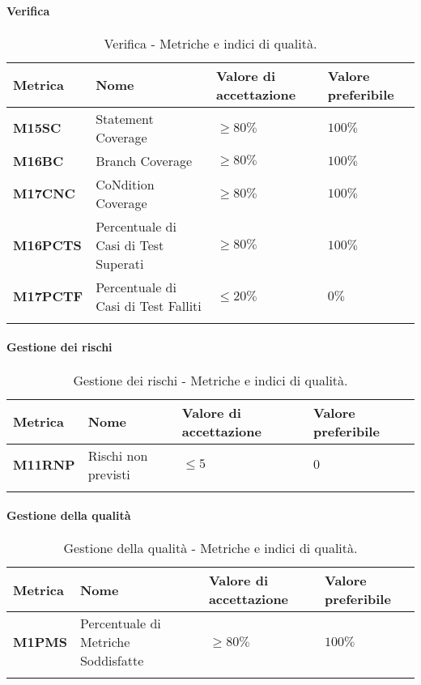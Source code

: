 \paragraph{Verifica}
\hspace{1pt}
\begin{longtable}{|C{1.5cm}|L{3cm}|L{2.5cm}|L{2.5cm}|}
    \hline
    \textbf{Metrica} & \textbf{Nome} & \textbf{Valore di accettazione} & \textbf{Valore preferibile} \\
    \hline
    \textbf{M15SC} & Statement Coverage & $\geq 80\%$ & $100\%$ \\
    \hline
    \textbf{M16BC} & Branch Coverage & $\geq 80\%$ & $100\%$ \\
    \hline
    \textbf{M17CNC} & CoNdition Coverage & $\geq 80\%$ & $100\%$ \\
    \hline
    \textbf{M16PCTS} & Percentuale di Casi di Test Superati & $\geq 80\%$ & $100\%$ \\
    \hline
    \textbf{M17PCTF} & Percentuale di Casi di Test Falliti & $\leq 20\%$ & $0\%$ \\
    \hline
\caption{Verifica - Metriche e indici di qualità.}
\label{tab:metriche_testo}
\end{longtable}


\paragraph{Gestione dei rischi}
\hspace{1pt}
    \begin{longtable}{|C{1.5cm}|L{3cm}|L{2.5cm}|L{2.5cm}|}
        \hline
      \textbf{Metrica} & \textbf{Nome} & \textbf{Valore di accettazione} & \textbf{Valore preferibile} \\
      \hline
      \textbf{M11RNP}    & Rischi non previsti  & $\leq 5$ &   $0$ \\
      \hline
    \caption{Gestione dei rischi - Metriche e indici di qualità.}
    \label{tab:tabella2}
\end{longtable}


\paragraph{Gestione della qualità}
\hspace{1pt}
    \begin{longtable}{|C{1.5cm}|L{3cm}|L{2.5cm}|L{2.5cm}|}
        \hline
        \textbf{Metrica} & \textbf{Nome} & \textbf{Valore di accettazione} & \textbf{Valore preferibile} \\
        \hline
        \textbf{M1PMS} & Percentuale di Metriche Soddisfatte & $\geq 80\%$ & $100\%$ \\
        \hline
    \caption{Gestione della qualità - Metriche e indici di qualità.}
    \label{tab:gestione_metriche_testo}
\end{longtable}



